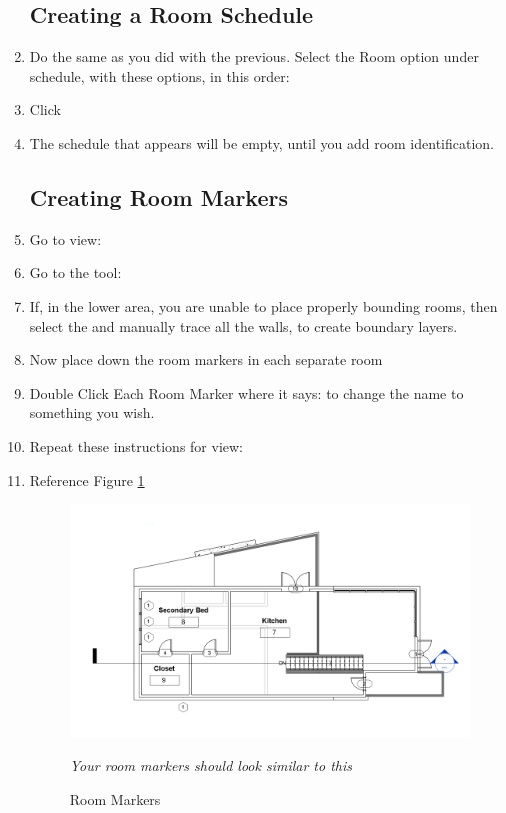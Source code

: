\documentclass{tufte-book} %
\begin{document}
\begin{enumerate}
	\subsection{Creating a Room Schedule}
		\item Do the same as you did with the previous. Select the Room option under  schedule, with these options, in this order: 
		\item Click 
		\item The schedule that appears will be empty, until you add room identification.
		
	\subsection{Creating Room Markers}
		\item Go to view: 
		\item Go to the tool: 
		\item If, in the lower area, you are unable to place properly bounding rooms, then select the  and manually trace all the walls, to create boundary layers.
		\item Now place down the room markers in each separate room
		\item Double Click Each Room Marker where it says:  to change the name to something you wish.
		\item Repeat these instructions for view: 
		\item Reference Figure \ref{fig:revroommarkers}
		
		\begin{figure}
			\includegraphics[width=\linewidth]{revitroommakers.png}
			\caption{Room Markers}
			\emph{Your room markers should look similar to this}
			\label{fig:revroommarkers}
		\end{figure}
		

\end{enumerate}
\end{document}
